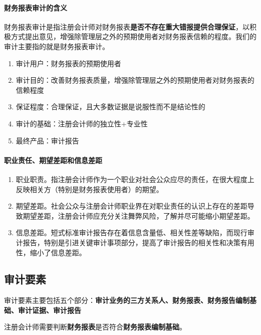 \documentclass[UTF8,12pt]{ctexart}
\numberwithin{equation}{section} %
\numberwithin{figure}{section}
\numberwithin{table}{section}
\begin{document}
	\paragraph{财务报表审计的含义}财务报表审计是指注册会计师对财务报表\textbf{是否不存在重大错报提供合理保证}，以积极方式提出意见，增强除管理层之外的预期使用者对财务报表信赖的程度。我们的审计主要指的就是财务报表审计。
	
	\begin{enumerate}
		\item 审计用户：财务报表的预期使用者
		
		\item 审计目的：改善财务报表质量，增强除管理层之外的预期使用者对财务报表的信赖程度
		
		\item 保证程度：合理保证，且大多数证据是说服性而不是结论性的
		
		\item 审计的基础：注册会计师的独立性+专业性
		
		\item 最终产品：审计报告
	\end{enumerate}
	
	
	\paragraph{职业责任、期望差距和信息差距}
	\begin{enumerate}
		\item 职业职责。指注册会计师作为一个职业对社会公众应尽的责任，在很大程度上反映相关方（特别是财务报表使用者）的期望。
		
		\item 期望差距。社会公众与注册会计师职业界在对职业责任的认识上存在的差距导致期望差距，注册会计师应充分关注舞弊风险，了解并尽可能缩小期望差距。
		
		\item 信息差距。短式标准审计报告存在着信息含量低、相关性差等缺陷，而现行审计报告，特别是引进关键审计事项部分，提高了审计报告的相关性和决策有用性，缩小了信息差距。
	\end{enumerate}
	
	
	\subsection{审计要素}
	审计要素主要包括五个部分：\textbf{审计业务的三方关系人、财务报表、财务报告编制基础、审计证据、审计报告}
	
	注册会计师需要判断\textbf{财务报表}是否符合\textbf{财务报表编制基础}。
	
\end{document}
